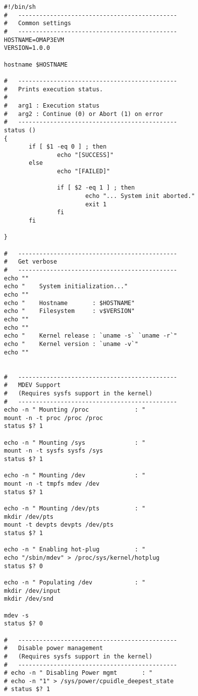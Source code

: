 \begin{verbatim}
#!/bin/sh
#   ---------------------------------------------
#   Common settings
#   ---------------------------------------------
HOSTNAME=OMAP3EVM
VERSION=1.0.0

hostname $HOSTNAME

#   ---------------------------------------------
#   Prints execution status.
#
#   arg1 : Execution status
#   arg2 : Continue (0) or Abort (1) on error
#   ---------------------------------------------
status ()
{
       if [ $1 -eq 0 ] ; then
               echo "[SUCCESS]"
       else
               echo "[FAILED]"

               if [ $2 -eq 1 ] ; then
                       echo "... System init aborted."
                       exit 1
               fi
       fi

}

#   ---------------------------------------------
#   Get verbose
#   ---------------------------------------------
echo ""
echo "    System initialization..."
echo ""
echo "    Hostname       : $HOSTNAME"
echo "    Filesystem     : v$VERSION"
echo ""
echo ""
echo "    Kernel release : `uname -s` `uname -r`"
echo "    Kernel version : `uname -v`"
echo ""


#   ---------------------------------------------
#   MDEV Support
#   (Requires sysfs support in the kernel)
#   ---------------------------------------------
echo -n " Mounting /proc             : "
mount -n -t proc /proc /proc
status $? 1

echo -n " Mounting /sys              : "
mount -n -t sysfs sysfs /sys
status $? 1

echo -n " Mounting /dev              : "
mount -n -t tmpfs mdev /dev
status $? 1

echo -n " Mounting /dev/pts          : "
mkdir /dev/pts
mount -t devpts devpts /dev/pts
status $? 1

echo -n " Enabling hot-plug          : "
echo "/sbin/mdev" > /proc/sys/kernel/hotplug
status $? 0

echo -n " Populating /dev            : "
mkdir /dev/input
mkdir /dev/snd

mdev -s
status $? 0

#   ---------------------------------------------
#   Disable power management
#   (Requires sysfs support in the kernel)
#   ---------------------------------------------
# echo -n " Disabling Power mgmt       : "
# echo -n "1" > /sys/power/cpuidle_deepest_state
# status $? 1


\end{verbatim}
